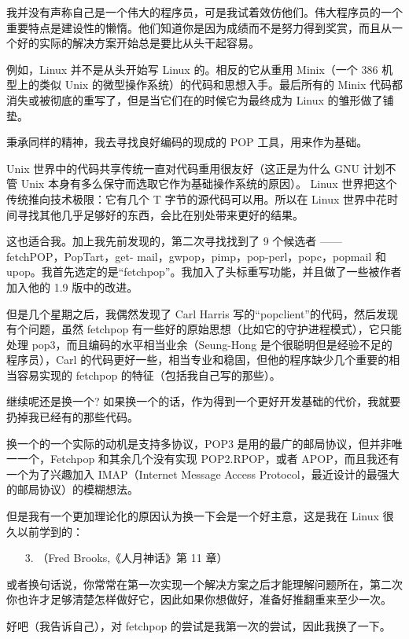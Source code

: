 我并没有声称自己是一个伟大的程序员，可是我试着效仿他们。伟大程序员的一个重要特点是建设性的懒惰。他们知道你是因为成绩而不是努力得到奖赏，而且从一个好的实际的解决方案开始总是要比从头干起容易。


例如，Linux 并不是从头开始写 Linux 的。相反的它从重用 Minix（一个 386 机型上的类似 Unix 的微型操作系统）的代码和思想入手。最后所有的 Minix 代码都消失或被彻底的重写了，但是当它们在的时候它为最终成为 Linux 的雏形做了铺垫。


秉承同样的精神，我去寻找良好编码的现成的 POP 工具，用来作为基础。


Unix 世界中的代码共享传统一直对代码重用很友好（这正是为什么 GNU 计划不管 Unix 本身有多么保守而选取它作为基础操作系统的原因）。 Linux 世界把这个传统推向技术极限：它有几个 T 字节的源代码可以用。所以在 Linux 世界中花时间寻找其他几乎足够好的东西，会比在别处带来更好的结果。


这也适合我。加上我先前发现的，第二次寻找找到了 9 个候选者 —— fetchPOP，PopTart，get- mail，gwpop，pimp，pop-perl，popc，popmail 和 upop。我首先选定的是“fetchpop”。我加入了头标重写功能，并且做了一些被作者加入他的 1.9 版中的改进。


但是几个星期之后，我偶然发现了 Carl Harris 写的“popclient”的代码，然后发现有个问题，虽然 fetchpop 有一些好的原始思想（比如它的守护进程模式），它只能处理 pop3，而且编码的水平相当业余（Seung-Hong 是个很聪明但是经验不足的程序员），Carl 的代码更好一些，相当专业和稳固，但他的程序缺少几个重要的相当容易实现的 fetchpop 的特征（包括我自己写的那些）。


继续呢还是换一个? 如果换一个的话，作为得到一个更好开发基础的代价，我就要扔掉我已经有的那些代码。


换一个的一个实际的动机是支持多协议，POP3 是用的最广的邮局协议，但并非唯一一个，Fetchpop 和其余几个没有实现 POP2.RPOP，或者 APOP，而且我还有一个为了兴趣加入 IMAP（Internet Message Access Protocol，最近设计的最强大的邮局协议）的模糊想法。


但是我有一个更加理论化的原因认为换一下会是一个好主意，这是我在 Linux 很久以前学到的：

\begin{enumerate}
\item[3.] （Fred Brooks,《人月神话》第 11 章）
\end{enumerate}

或者换句话说，你常常在第一次实现一个解决方案之后才能理解问题所在，第二次你也许才足够清楚怎样做好它，因此如果你想做好，准备好推翻重来至少一次。


好吧（我告诉自己），对 fetchpop 的尝试是我第一次的尝试，因此我换了一下。


